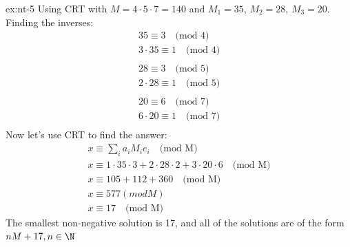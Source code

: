 \begin{solution}{ex:nt-5}
  Using CRT with $M=4\cdot 5\cdot 7=140$ and $M_1=35$, $M_2=28$, $M_3=20$. Finding the inverses:
  \[
    \begin{gathered}
      35\equiv 3 \quad \text{(mod 4)}\\
      3\cdot 35 \equiv 1 \quad \text{(mod 4)}\\\\
      28\equiv 3 \quad \text{(mod 5)}\\
      2\cdot 28 \equiv 1 \quad \text{(mod 5)}\\\\
      20\equiv 6 \quad \text{(mod 7)}\\
      6\cdot 20 \equiv 1 \quad \text{(mod 7)}\\
    \end{gathered}
  \]
  Now let's use CRT to find the answer:
  \[
    \begin{gathered}
      x\equiv \sum_i a_i M_i e_i \quad \text{(mod M)}\\
      x \equiv 1 \cdot 35 \cdot 3 + 2\cdot 28 \cdot 2 + 3\cdot 20 \cdot 6 \quad \text{(mod M)}\\
      x \equiv 105 + 112 + 360 \quad \text{(mod M)}\\
      x \equiv 577 (mod M)\\
      x \equiv 17 \quad \text{(mod M)}
    \end{gathered}
  \]
  The smallest non-negative solution is 17, and all of the solutions are of the form $nM+17, n\in \N$
\end{solution}

